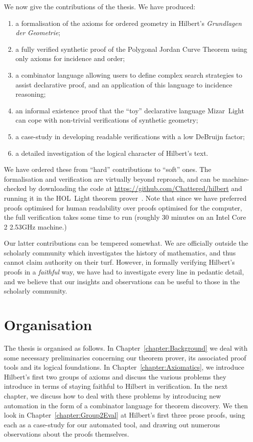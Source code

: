 We now give the contributions of the thesis. We have produced:
\begin{enumerate}
\item a formalisation of the axioms for ordered geometry in Hilbert's \emph{Grundlagen der Geometrie};
\item a fully verified synthetic proof of the Polygonal Jordan Curve Theorem using only axioms for incidence and order;
\item a combinator language allowing users to define complex search strategies to assist declarative proof, and an application of this language to incidence reasoning;
\item an informal existence proof that the ``toy'' declarative language Mizar~Light~\cite{MizarLight} can cope with non-trivial verifications of synthetic geometry;
\item a case-study in developing readable verifications with a low DeBruijn factor;
\item a detailed investigation of the logical character of Hilbert's text.
\end{enumerate}

We have ordered these from ``hard'' contributions to ``soft'' ones. The formalisation and verification are virtually beyond reproach, and can be machine-checked by downloading the code at \url{https://github.com/Chattered/hilbert} and running it in the HOL~Light theorem prover~\cite{HOLLight}. Note that since we have preferred proofs optimised for human readability over proofs optimised for the computer, the full verification takes some time to run (roughly 30 minutes on an Intel Core 2 2.53GHz machine.)

Our latter contributions can be tempered somewhat. We are officially outside the scholarly community which investigates the history of mathematics, and thus cannot claim authority on their turf. However, in formally verifying Hilbert's proofs in a \emph{faithful} way, we have had to investigate every line in pedantic detail, and we believe that our insights and observations can be useful to those in the scholarly community.

\section{Organisation}
The thesis is organised as follows. In Chapter~\ref{chapter:Background} we deal with some necessary preliminaries concerning our theorem prover, its associated proof tools and its logical foundations. In Chapter~\ref{chapter:Axiomatics}, we introduce Hilbert's first two groups of axioms and discuss the various problems they introduce in terms of staying faithful to Hilbert in verification. In the next chapter, we discuss how to deal with these problems by introducing new automation in the form of a combinator language for theorem discovery. We then look in Chapter~\ref{chapter:Group2Eval} at Hilbert's first three prose proofs, using each as a case-study for our automated tool, and drawing out numerous observations about the proofs themselves. 

